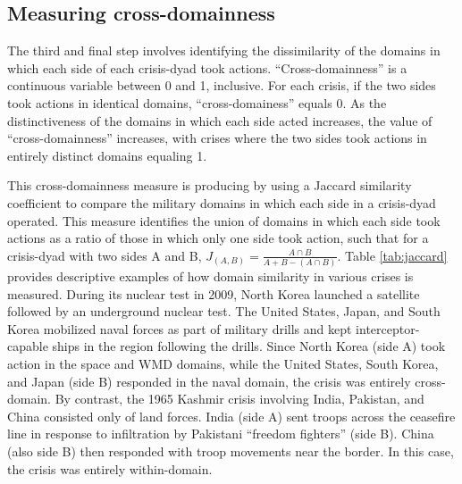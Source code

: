 \documentclass[
]{article}
\begin{document}
\hypertarget{measuring-cross-domainness}{%
\subsection{Measuring cross-domainness}\label{measuring-cross-domainness}}

The third and final step involves identifying the dissimilarity of the domains in which each side of each crisis-dyad took actions. ``Cross-domainness'' is a continuous variable between 0 and 1, inclusive. For each crisis, if the two sides took actions in identical domains, ``cross-domainess'' equals 0. As the distinctiveness of the domains in which each side acted increases, the value of ``cross-domainness'' increases, with crises where the two sides took actions in entirely distinct domains equaling 1.

This cross-domainness measure is producing by using a Jaccard similarity coefficient to compare the military domains in which each side in a crisis-dyad operated. This measure identifies the union of domains in which each side took actions as a ratio of those in which only one side took action, such that for a crisis-dyad with two sides A and B, \(J_{(A, B)} = \frac{A \cap B}{A + B - (A \cap B)}\). Table \ref{tab:jaccard} provides descriptive examples of how domain similarity in various crises is measured. During its nuclear test in 2009, North Korea launched a satellite followed by an underground nuclear test. The United States, Japan, and South Korea mobilized naval forces as part of military drills and kept interceptor-capable ships in the region following the drills. Since North Korea (side A) took action in the space and WMD domains, while the United States, South Korea, and Japan (side B) responded in the naval domain, the crisis was entirely cross-domain. By contrast, the 1965 Kashmir crisis involving India, Pakistan, and China consisted only of land forces. India (side A) sent troops across the ceasefire line in response to infiltration by Pakistani ``freedom fighters'' (side B). China (also side B) then responded with troop movements near the border. In this case, the crisis was entirely within-domain.
\end{document}
